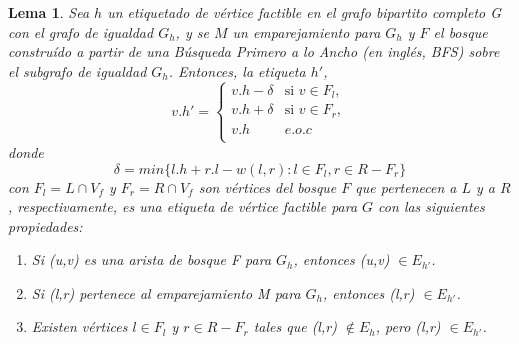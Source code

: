 \documentclass[10pt]{article} %
\newtheorem{lem}{Lema}
\begin{document}
\begin{lem}
	\cite{introduction}
	Sea $h$ un etiquetado de v\'ertice factible en el grafo bipartito completo G con el grafo de igualdad $G_h$, y se $M$ un emparejamiento para $G_h$ y $F$ el bosque constru\'ido a partir de una B\'usqueda Primero a lo Ancho (en ingl\'es, BFS) sobre el subgrafo de igualdad $G_h$. Entonces, la etiqueta $h'$,
	\begin{equation}
		v.h' =  \left\{
		\begin{array}{ll}
			v.h-\delta & \text{si $v \in F_l$}, \\
			v.h+\delta & \text{si $v \in F_r$}, \\
			v.h & e.o.c \\
		\end{array} 
		\right.
	\end{equation}				
	donde 
	\begin{equation}
		\label{eqn:delta}
		\delta = min\{l.h + r.l - w(l,r): l\in F_l, r \in R-F_r\}
	\end{equation}
	con $F_l = L \cap V_f$ y $F_r = R \cap V_f$ son v\'ertices del bosque $F$ que pertenecen a $L$ y a $R$, respectivamente, es una etiqueta de v\'ertice factible para $G$ con las siguientes propiedades:
	\begin{enumerate}
		\item Si (u,v) es una arista de bosque F para $G_h$, entonces (u,v) $\in E_{h'}$.
		\item Si (l,r) pertenece al emparejamiento M para $G_h$, entonces (l,r) $\in E_{h'}$.
		\item Existen v\'ertices $l \in F_l$ y $r \in R - F_r$ tales que (l,r) $\notin E_h$, pero (l,r) $\in E_{h'}$.  
	\end{enumerate} 
\end{lem}
\end{document}
